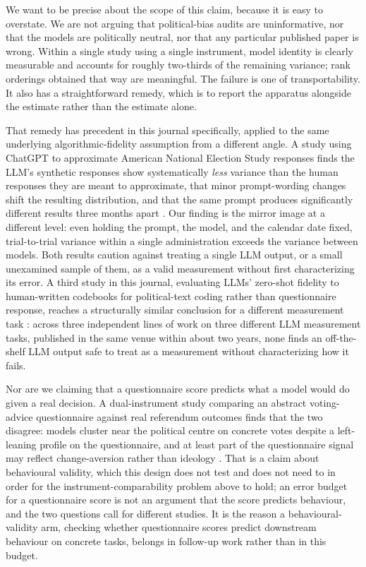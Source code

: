 \documentclass[11pt]{article}
\begin{document}
We want to be precise about the scope of this claim, because it is easy to
overstate. We are not arguing that political-bias audits are uninformative,
nor that the models are politically neutral, nor that any particular
published paper is wrong. Within a single study using a single instrument,
model identity is clearly measurable and accounts for roughly two-thirds of
the remaining variance; rank orderings obtained that way are meaningful.
The failure is one of transportability. It also has a straightforward
remedy, which is to report the apparatus alongside the estimate rather than
the estimate alone.

That remedy has precedent in this journal specifically, applied to the same
underlying algorithmic-fidelity assumption from a different angle. A study
using ChatGPT to approximate American National Election Study responses
finds the LLM's synthetic responses show systematically \emph{less}
variance than the human responses they are meant to approximate, that
minor prompt-wording changes shift the resulting distribution, and that the
same prompt produces significantly different results three months apart
\citep{bisbee2024}. Our finding is the mirror image at a different level:
even holding the prompt, the model, and the calendar date fixed, trial-to-trial
variance within a single administration exceeds the variance between
models. Both results caution against treating a single LLM output, or a
small unexamined sample of them, as a valid measurement without first
characterizing its error. A third study in this journal, evaluating LLMs'
zero-shot fidelity to human-written codebooks for political-text coding
rather than questionnaire response, reaches a structurally similar
conclusion for a different measurement task \citep{halterman2025codebook}:
across three independent lines of work on three different LLM measurement
tasks, published in the same venue within about two years, none finds an
off-the-shelf LLM output safe to treat as a measurement without
characterizing how it fails.

Nor are we claiming that a questionnaire score predicts what a model would
do given a real decision. A dual-instrument study comparing an abstract
voting-advice questionnaire against real referendum outcomes finds that the
two disagree: models cluster near the political centre on concrete votes
despite a left-leaning profile on the questionnaire, and at least part of
the questionnaire signal may reflect change-aversion rather than ideology
\citep{barmettler2026instrument}. That is a claim about behavioural validity,
which this design does not test and does not need to in order for the
instrument-comparability problem above to hold; an error budget for a
questionnaire score is not an argument that the score predicts behaviour,
and the two questions call for different studies. It is the reason a
behavioural-validity arm, checking whether questionnaire scores predict
downstream behaviour on concrete tasks, belongs in follow-up work rather
than in this budget.
\end{document}
